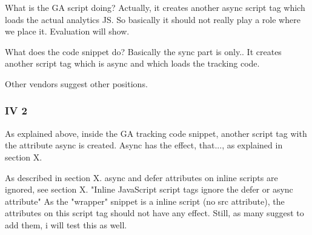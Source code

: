 





What is the GA script doing?
Actually, it creates another async script tag which loads the actual analytics JS.
So basically it should not really play a role where we place it.
Evaluation will show.

What does the code snippet do?
Basically the sync part is only..
It creates another script tag which is async and which loads the tracking code.



Other vendors suggest other positions.









\subsubsection{IV 2}

As explained above, inside the GA tracking code snippet, another script tag with the attribute async is created.
Async has the effect, that..., as explained in section X.

As described in section X. async and defer attributes on inline scripts are ignored, see section X.
"Inline JavaScript script tags ignore the defer or async attribute"
As the "wrapper" snippet is a inline script (no src attribute), the attributes on this script tag should not have any effect.
Still, as many suggest to add them, i will test this as well.

